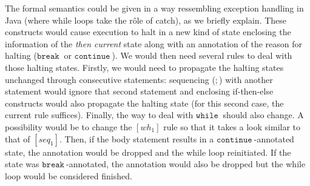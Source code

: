 \documentclass[a4wide,12pt]{article}
\def\while{\texttt{while}\ }
\def\cont {\texttt{continue}\ }
\def\break{\texttt{break}\ }
\begin{document}
The formal semantics could be given in a way ressembling exception handling in Java (where while loops take
the r\^{o}le of catch), as we briefly explain. These constructs
would cause execution to halt in a new kind of state
enclosing the information of the \emph{then current} state along with an annotation of the reason
for halting ($\break$ or $\cont$).
We would then need several rules to deal with those halting states.
Firstly, we would need to propagate the halting states unchanged through consecutive statements:
sequencing ($;$) with another statement would ignore that second statement and enclosing
if-then-else constructs would also propagate the halting state (for this second case, the current
rule suffices). Finally, the way to deal with $\while$ should also change. A possibility
would be to change the $[wh_1]$ rule so that it takes a look similar to that of $[seq_1]$.
Then, if the body statement results in a $\cont$-annotated state, the annotation would be dropped
and the while loop reinitiated. If the state was $\break$-annotated, the annotation would also be
dropped but the while loop would be considered finished.
 
\end{document}
